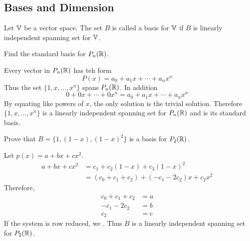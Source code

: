\documentclass[english, 12pt]{article}
\begin{document}
\subsection{Bases and Dimension}

\begin{defn}
Let ${\mathbb{V}}$ be a vector space. The set $B$ is called a basis for ${\mathbb{V}}$ if $B$ is linearly independent spanning set for ${\mathbb{V}}$.
\end{defn}

\begin{exmp}
Find the standard basis for $P_n({\mathbb{R}})$.
\begin{sol}
Every vector in $P_n({\mathbb{R}})$ has teh form
\[P(x) = a_0 + a_1x + \cdots + a_n x^n\]
Thus the set $\{1,x,\dots,x^n\}$ spans $P_n({\mathbb{R}})$. In addition
\[0 + 0x + \cdots + 0x^n = a_0 + a_1 x + \cdots + a_n x^n\]
By equating like powers of $x$, the only solution is the trivial solution. Therefore $\{1,x,\dots,x^n\}$ is a linearly independent spanning set for $P_n({\mathbb{R}})$ and is its standard basis.
\end{sol}
\end{exmp}

\begin{exmp}
Prove that $B = \{1,(1-x),(1-x)^2\}$ is a basis for $P_2({\mathbb{R}})$.
\begin{sol}
Let $p(x) = a + bx + cx^2$.
\begin{align*}
a + bx + cx^2 &= c_{1} + c_{2}(1-x) + c_{3} (1-x)^2 \\
&= (c_0 + c_1 + c_2) + (-c_1 - 2c_2)x + c_2 x^2
\end{align*}
Therefore,
\begin{align*}
c_0 + c_1 + c_2 &=a\\
-c_1 - 2c_2 &=b\\
c_2 &=c
\end{align*}
If the system is row reduced, we . Thus $B$ is a linearly independent spanning set for $P_2({\mathbb{R}})$.
\end{sol}
\end{exmp}
\end{document}
